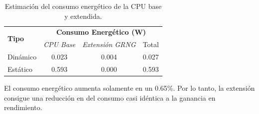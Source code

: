 \begin{table}[h]
\centering
\caption{Estimación del consumo energético de la CPU base y extendida.}
\label{tab:riscv_fpga_power}
\begin{tabular}{lccc}
\hline
\multirow{2}{*}{\textbf{Tipo}} & \multicolumn{3}{c}{\textbf{Consumo Energético (W)}} \\
 & \textit{CPU Base} & \textit{Extensión GRNG} & Total \\ \hline
Dinámico & 0.023 & 0.004 & 0.027\\
Estático & 0.593 & 0.000 & 0.593\\ \hline
\end{tabular}
\end{table}

El consumo energético aumenta solamente en un 0.65\%. Por lo tanto, la extensión consigue una reducción en del consumo casi idéntica a la ganancia en rendimiento.
